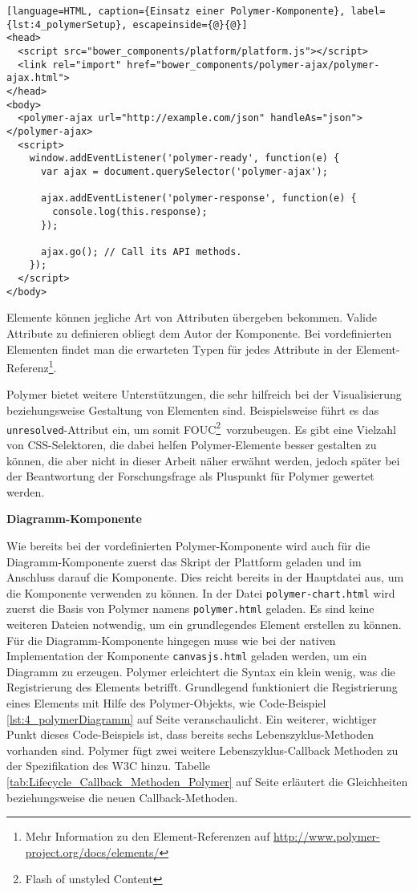 \begin{lstlisting}[language=HTML, caption={Einsatz einer Polymer-Komponente}, label={lst:4_polymerSetup}, escapeinside={@}{@}]
<head>
  <script src="bower_components/platform/platform.js"></script>
  <link rel="import" href="bower_components/polymer-ajax/polymer-ajax.html">
</head>
<body>
  <polymer-ajax url="http://example.com/json" handleAs="json"></polymer-ajax>
  <script>
    window.addEventListener('polymer-ready', function(e) {
      var ajax = document.querySelector('polymer-ajax');

      ajax.addEventListener('polymer-response', function(e) {
        console.log(this.response);
      });

      ajax.go(); // Call its API methods.
    });
  </script>
</body>
\end{lstlisting}

Elemente können jegliche Art von Attributen übergeben bekommen. Valide Attribute zu definieren obliegt dem Autor der Komponente. Bei vordefinierten Elementen findet man die erwarteten Typen für jedes Attribute in der Element-Referenz\footnote{Mehr Information zu den Element-Referenzen auf \url{http://www.polymer-project.org/docs/elements/}}.

Polymer bietet weitere Unterstützungen, die sehr hilfreich bei der Visualisierung beziehungsweise Gestaltung von Elementen sind. Beispielsweise führt es das \lstinline|unresolved|-Attribut ein, um somit \glqq FOUC\footnote{Flash of unstyled Content}\grqq\ vorzubeugen. Es gibt eine Vielzahl von CSS-Selektoren, die dabei helfen Polymer-Elemente besser gestalten zu können, die aber nicht in dieser Arbeit näher erwähnt werden, jedoch später bei der Beantwortung der Forschungsfrage als Pluspunkt für Polymer gewertet werden.

\textbf{Diagramm-Komponente}

Wie bereits bei der vordefinierten Polymer-Komponente wird auch für die Diagramm-Komponente zuerst das Skript der Plattform geladen und im Anschluss darauf die Komponente. Dies reicht bereits in der Hauptdatei aus, um die Komponente verwenden zu können. In der Datei \lstinline|polymer-chart.html| wird zuerst die Basis von Polymer namens \lstinline|polymer.html| geladen. Es sind keine weiteren Dateien notwendig, um ein grundlegendes Element erstellen zu können. Für die Diagramm-Komponente hingegen muss wie bei der nativen Implementation der Komponente \lstinline|canvasjs.html| geladen werden, um ein Diagramm zu erzeugen. Polymer erleichtert die Syntax ein klein wenig, was die Registrierung des Elements betrifft. Grundlegend funktioniert die Registrierung eines Elements mit Hilfe des Polymer-Objekts, wie Code-Beispiel \ref{lst:4_polymerDiagramm} auf Seite \pageref{lst:4_polymerDiagramm} veranschaulicht. Ein weiterer, wichtiger Punkt dieses Code-Beispiels ist, dass bereits sechs Lebenszyklus-Methoden vorhanden sind. Polymer fügt zwei weitere Lebenszyklus-Callback Methoden zu der Spezifikation des W3C hinzu. Tabelle \ref{tab:Lifecycle_Callback_Methoden_Polymer} auf Seite \pageref{tab:Lifecycle_Callback_Methoden_Polymer} erläutert die Gleichheiten beziehungsweise die neuen Callback-Methoden.

